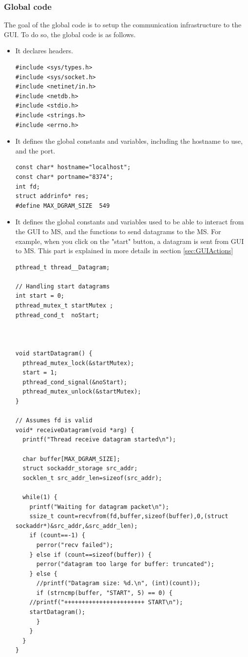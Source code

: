 \documentclass[12pt]{article}
\begin{document}
\subsubsection{Global code}
The goal of the global code is to setup the communication infrastructure to the GUI. To do so, the global code is as follows.
\begin{itemize}
\item It declares headers.
\begin{lstlisting}
#include <sys/types.h>
#include <sys/socket.h>
#include <netinet/in.h>
#include <netdb.h>
#include <stdio.h>
#include <strings.h>
#include <errno.h>
\end{lstlisting}

\item It defines the global constants and variables, including the hostname to use, and the port.
\begin{lstlisting}
const char* hostname="localhost";
const char* portname="8374";
int fd;
struct addrinfo* res;
#define MAX_DGRAM_SIZE  549
\end{lstlisting}

\item It defines the global constants and variables used to be able to interact from the GUI to MS, and the functions to send datagrams to the MS. For example, when you click on the "start" button, a datagram is sent from GUI to MS. This part is explained in more details in section {\ref{sec:GUIActions}}
\begin{lstlisting}
pthread_t thread__Datagram;

// Handling start datagrams
int start = 0;
pthread_mutex_t startMutex ;
pthread_cond_t  noStart;



void startDatagram() {
  pthread_mutex_lock(&startMutex);
  start = 1;
  pthread_cond_signal(&noStart);
  pthread_mutex_unlock(&startMutex);
}

// Assumes fd is valid
void* receiveDatagram(void *arg) {
  printf("Thread receive datagram started\n");

  char buffer[MAX_DGRAM_SIZE];
  struct sockaddr_storage src_addr;
  socklen_t src_addr_len=sizeof(src_addr);

  while(1) {
    printf("Waiting for datagram packet\n");
    ssize_t count=recvfrom(fd,buffer,sizeof(buffer),0,(struct sockaddr*)&src_addr,&src_addr_len);
    if (count==-1) {
      perror("recv failed");
    } else if (count==sizeof(buffer)) {
      perror("datagram too large for buffer: truncated");
    } else {
      //printf("Datagram size: %d.\n", (int)(count));
      if (strncmp(buffer, "START", 5) == 0) {
	//printf("+++++++++++++++++++++++ START\n");
	startDatagram();
      }
    }
  }
}
\end{lstlisting}



\end{itemize}
\end{document}
